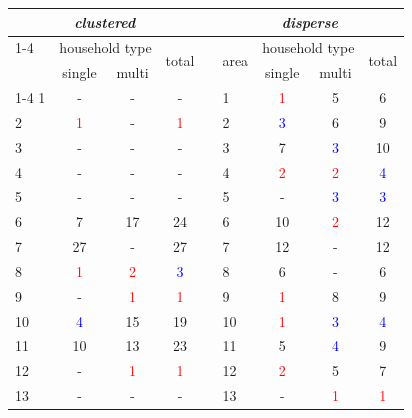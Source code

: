 \begin{table}[H]
    \centering
    \begin{tabular}{|l|cc|c|  c  |l|cc|c|}
        \multicolumn{4}{c}{\emph{clustered}} & \multicolumn{1}{c}{} & \multicolumn{4}{c}{\emph{disperse}}\\[7pt]
        \cline{1-4} \cline{6-9}
        \multirow{2}{*}{area} & \multicolumn{2}{c|}{household type} & \multirow{2}{*}{total} & &
        \multirow{2}{*}{area} & \multicolumn{2}{c|}{household type} & \multirow{2}{*}{total}\\[5pt]
         & single & multi & & & & single & multi & \\
        \cline{1-4} \cline{6-9}
        1  & -  & -  & - &  & 1  & \textcolor{red}{1}  & 5 & 6  \\
        2  & \cellcolor{lgrey}\textcolor{red}{1}  & \cellcolor{lgrey}- & \cellcolor{lgrey}\textcolor{red}{1} &  & 2  & \textcolor{blue}{3}  & 6 & 9  \\
        3  & -  & -  & -  &  & 3  & 7  & \textcolor{blue}{3} & 10 \\
        4  & -  & -  & -  &  & 4  & \textcolor{red}{2}  & \textcolor{red}{2} & \textcolor{blue}{4}  \\
        5  & -  & -  & -  &  & 5  & \cellcolor{lgrey}-  & \cellcolor{lgrey}\textcolor{blue}{3} & \cellcolor{lgrey}\textcolor{blue}{3}  \\
        6  & 7  & 17 & 24 &  & 6  & 10 & \textcolor{red}{2} & 12 \\
        7  & \cellcolor{lgrey}27 & \cellcolor{lgrey}-  & \cellcolor{lgrey}27 &  & 7  & \cellcolor{lgrey}12 & \cellcolor{lgrey}- & \cellcolor{lgrey}12 \\
        8  & \textcolor{red}{1}  & \textcolor{red}{2}  & \textcolor{blue}{3}  &  & 8  & \cellcolor{lgrey}6  & \cellcolor{lgrey}- & \cellcolor{lgrey}6  \\
        9  & \cellcolor{lgrey}- & \cellcolor{lgrey}\textcolor{red}{1}  & \cellcolor{lgrey}\textcolor{red}{1}  &  & 9  & \textcolor{red}{1}  & 8 & 9  \\
        10 & \textcolor{blue}{4}  & 15 & 19 &  & 10 & \textcolor{red}{1}  & \textcolor{blue}{3} & \textcolor{blue}{4}  \\
        11 & 10 & 13 & 23 &  & 11 & 5  & \textcolor{blue}{4} & 9  \\
        12 & \cellcolor{lgrey}-  & \cellcolor{lgrey}\textcolor{red}{1}  & \cellcolor{lgrey}\textcolor{red}{1}  &  & 12 & \textcolor{red}{2}  & 5 & 7  \\
        13 & -  & -  & -  &  & 13 & \cellcolor{lgrey}-  & \cellcolor{lgrey}\textcolor{red}{1} & \cellcolor{lgrey}\textcolor{red}{1}  \\

\end{tabular}
\end{table}
